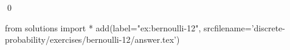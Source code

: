 
\begin{ex} 
  \label{ex:bernoulli-12}
  
  \qed
\end{ex} 
\begin{python0}
from solutions import *
add(label="ex:bernoulli-12",
    srcfilename='discrete-probability/exercises/bernoulli-12/answer.tex') 
\end{python0}
